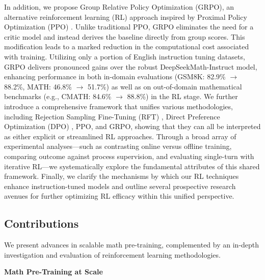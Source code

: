 In addition, we propose Group Relative Policy Optimization (GRPO), an alternative reinforcement learning (RL) approach inspired by Proximal Policy Optimization (PPO) \citep{schulman2017proximal}. Unlike traditional PPO, GRPO eliminates the need for a critic model and instead derives the baseline directly from group scores. This modification leads to a marked reduction in the computational cost associated with training. Utilizing only a portion of English instruction tuning datasets, GRPO delivers pronounced gains over the robust DeepSeekMath-Instruct model, enhancing performance in both in-domain evaluations (GSM8K: 82.9\% $\rightarrow$ 88.2\%, MATH: 46.8\% $\rightarrow$ 51.7\%) as well as on out-of-domain mathematical benchmarks (e.g., CMATH: 84.6\% $\rightarrow$ 88.8\%) in the RL stage. We further introduce a comprehensive framework that unifies various methodologies, including Rejection Sampling Fine-Tuning (RFT) \citep{yuan2023scaling}, Direct Preference Optimization (DPO) \citep{dpo}, PPO, and GRPO, showing that they can all be interpreted as either explicit or streamlined RL approaches. Through a broad array of experimental analyses—such as contrasting online versus offline training, comparing outcome against process supervision, and evaluating single-turn with iterative RL—we systematically explore the fundamental attributes of this shared framework. Finally, we clarify the mechanisms by which our RL techniques enhance instruction-tuned models and outline several prospective research avenues for further optimizing RL efficacy within this unified perspective.

\subsection{Contributions}
We present advances in scalable math pre-training, complemented by an in-depth investigation and evaluation of reinforcement learning methodologies.

\textbf{Math Pre-Training at Scale}

